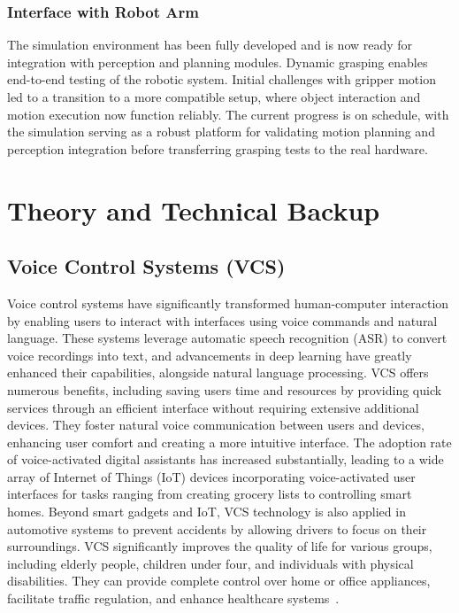 \documentclass[12pt]{extarticle}
\begin{document}
\subsubsection{Interface with Robot Arm}
The simulation environment has been fully developed and is now ready for integration with perception and planning modules. Dynamic grasping enables end-to-end testing of the robotic system. Initial challenges with gripper motion led to a transition to a more compatible setup, where object interaction and motion execution now function reliably. The current progress is on schedule, with the simulation serving as a robust platform for validating motion planning and perception integration before transferring grasping tests to the real hardware.

\newpage
\section{Theory and Technical Backup}

\subsection{Voice Control Systems (VCS)}
Voice control systems have significantly transformed human-computer interaction by enabling users to interact with interfaces using voice commands and natural language. These systems leverage automatic speech recognition (ASR) to convert voice recordings into text, and advancements in deep learning have greatly enhanced their capabilities, alongside natural language processing. VCS offers numerous benefits, including saving users time and resources by providing quick services through an efficient interface without requiring extensive additional devices. They foster natural voice communication between users and devices, enhancing user comfort and creating a more intuitive interface. The adoption rate of voice-activated digital assistants has increased substantially, leading to a wide array of Internet of Things (IoT) devices incorporating voice-activated user interfaces for tasks ranging from creating grocery lists to controlling smart homes. Beyond smart gadgets and IoT, VCS technology is also applied in automotive systems to prevent accidents by allowing drivers to focus on their surroundings. VCS significantly improves the quality of life for various groups, including elderly people, children under four, and individuals with physical disabilities. They can provide complete control over home or office appliances, facilitate traffic regulation, and enhance healthcare systems~\cite{vcs}.
\end{document}
